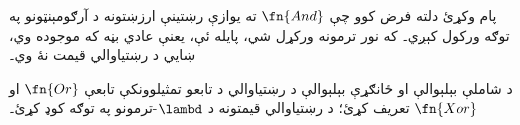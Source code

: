 \documentclass[../../../include/open-logic-section]{subfiles}
\begin{document}
پام وکړئ دلته فرض کوو چې $\fn{And}$ ته يوازې رښتينې
ارزښتونه د آرګومېنټونو په توګه ورکول کېږي۔ که نور
ترمونه ورکړل شي، پايله ئې، يعنې عادي بڼه که موجوده
وي، ښايي د رښتياوالي قيمت نۀ وي۔

\begin{prob}
  د شاملې بېلېوالې او ځانګړې بېلېوالې د رښتياوالي د تابعو
  تمثيلوونکې تابعې $\fn{Or}$ او $\fn{Xor}$ تعريف کړئ؛
  د رښتياوالي قيمتونه د $\lambd$-ترمونو په توګه کوډ کړئ۔
\end{prob}
\end{document}
